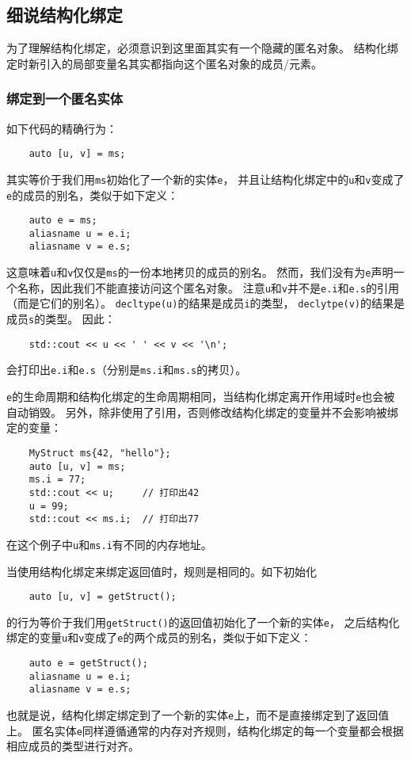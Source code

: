 \subsection{细说结构化绑定}
为了理解结构化绑定，必须意识到这里面其实有一个隐藏的匿名对象。
结构化绑定时新引入的局部变量名其实都指向这个匿名对象的成员/元素。

\subsubsection*{绑定到一个匿名实体}
如下代码的精确行为：
\begin{lstlisting}
    auto [u, v] = ms;
\end{lstlisting}
其实等价于我们用\texttt{ms}初始化了一个新的实体\texttt{e}，
并且让结构化绑定中的\texttt{u}和\texttt{v}变成了\texttt{e}的成员的别名，类似于如下定义：
\begin{lstlisting}
    auto e = ms;
    aliasname u = e.i;
    aliasname v = e.s;
\end{lstlisting}
这意味着\texttt{u}和\texttt{v}仅仅是\texttt{ms}的一份本地拷贝的成员的别名。
然而，我们没有为\texttt{e}声明一个名称，因此我们不能直接访问这个匿名对象。
注意\texttt{u}和\texttt{v}并不是\texttt{e.i}和\texttt{e.s}的引用（而是它们的别名）。
\texttt{decltype(u)}的结果是成员\texttt{i}的类型，
\texttt{declytpe(v)}的结果是成员\texttt{s}的类型。
因此：
\begin{lstlisting}
    std::cout << u << ' ' << v << '\n';
\end{lstlisting}
会打印出\texttt{e.i}和\texttt{e.s}（分别是\texttt{ms.i}和\texttt{ms.s}的拷贝）。

\texttt{e}的生命周期和结构化绑定的生命周期相同，当结构化绑定离开作用域时\texttt{e}也会被自动销毁。
另外，除非使用了引用，否则修改结构化绑定的变量并不会影响被绑定的变量：
\begin{lstlisting}
    MyStruct ms{42, "hello"};
    auto [u, v] = ms;
    ms.i = 77;
    std::cout << u;     // 打印出42
    u = 99;
    std::cout << ms.i;  // 打印出77
\end{lstlisting}
在这个例子中\texttt{u}和\texttt{ms.i}有不同的内存地址。

当使用结构化绑定来绑定返回值时，规则是相同的。如下初始化
\begin{lstlisting}
    auto [u, v] = getStruct();
\end{lstlisting}
的行为等价于我们用\texttt{getStruct()}的返回值初始化了一个新的实体\texttt{e}，
之后结构化绑定的变量\texttt{u}和\texttt{v}变成了\texttt{e}的两个成员的别名，类似于如下定义：
\begin{lstlisting}
    auto e = getStruct();
    aliasname u = e.i;
    aliasname v = e.s;
\end{lstlisting}
也就是说，结构化绑定绑定到了一个新的实体\texttt{e}上，而不是直接绑定到了返回值上。
匿名实体\texttt{e}同样遵循通常的内存对齐规则，结构化绑定的每一个变量都会根据相应成员的类型进行对齐。

